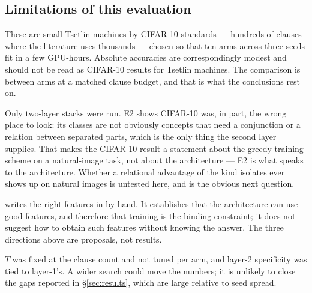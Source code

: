 \subsection{Limitations of this evaluation}

 These are small Tsetlin machines by CIFAR-10 standards --- hundreds of clauses
where the literature uses thousands --- chosen so that ten arms across three seeds fit in a
few GPU-hours. Absolute accuracies are correspondingly modest and should not be read as
CIFAR-10 results for Tsetlin machines. The comparison is between arms at a matched clause
budget, and that is what the conclusions rest on.

 Only two-layer stacks were run.
E2 shows CIFAR-10 was, in part, the wrong place to look: its classes are not obviously
concepts that need a conjunction or a relation between separated parts, which is the only
thing the second layer supplies. That makes the CIFAR-10 result a statement about the greedy
training scheme on a natural-image task, not about the architecture --- E2 is what speaks to
the architecture. Whether a relational advantage of the kind  isolates ever shows
up on natural images is untested here, and is the obvious next question.

  writes the right
features in by hand. It establishes that the architecture can use good features, and
therefore that training is the binding constraint; it does not suggest how to obtain such
features without knowing the answer. The three directions above are proposals, not results.

 $T$ was fixed at the clause count and not tuned per arm, and layer-2
specificity was tied to layer-1's. A wider search could move the numbers; it is unlikely to
close the gaps reported in \S\ref{sec:results}, which are large relative to seed spread.
